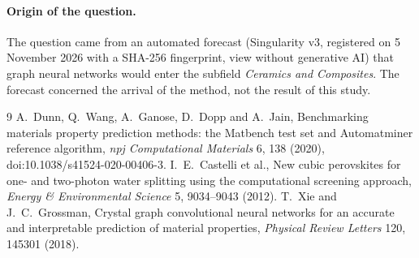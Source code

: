 \documentclass[11pt]{article}
\begin{document}
\paragraph{Origin of the question.} The question came from an automated forecast (Singularity v3, registered on 5
November 2026 with a SHA-256 fingerprint, view without generative AI) that graph neural networks would enter the subfield \emph{Ceramics and
Composites}. The forecast concerned the arrival of the method, not the result of this study.

\begin{thebibliography}{9}
 A.~Dunn, Q.~Wang, A.~Ganose, D.~Dopp and A.~Jain, Benchmarking materials property prediction
methods: the Matbench test set and Automatminer reference algorithm, \emph{npj Computational Materials} 6, 138
(2020), doi:10.1038/s41524-020-00406-3.
 I.~E.~Castelli et al., New cubic perovskites for one- and two-photon water splitting using the
computational screening approach, \emph{Energy \& Environmental Science} 5, 9034--9043 (2012).
 T.~Xie and J.~C.~Grossman, Crystal graph convolutional neural networks for an accurate and
interpretable prediction of material properties, \emph{Physical Review Letters} 120, 145301 (2018).
\end{thebibliography}
\end{document}
